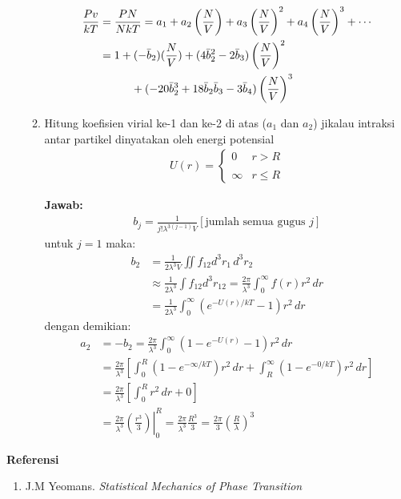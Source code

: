 \documentclass[a4paper , 12pt, cc]{article}
\begin{document}
\begin{enumerate}
\begin{enumerate}
\begin{align}
\frac{Pv}{kT} & = \frac{PN}{NkT} = a_1 + a_2 \left( \frac{N}{V}\right) + a_3 \left( \frac{N}{V}\right)^2 + a_4 \left( \frac{N}{V}\right)^3 + \cdots \nonumber \\
& = 1 + (- \bar{b}_2 )(\frac{N}{V}) + (4 \bar{b}_2^2 - 2 \bar{b}_3) \left( \frac{N}{V}\right)^2 \nonumber \\
& \hspace{1 cm } + (- 20 \bar{b}_2^3 + 18 \bar{b}_2 \bar{b}_3  - 3 \bar{b}_4) \left( \frac{N}{V}\right)^3 
\end{align}
\item Hitung koefisien virial ke-1 dan ke-2 di atas ($a_1$ dan $a_2$) jikalau intraksi antar partikel dinyatakan oleh energi potensial
\begin{align}
U(r) = \left\{ 
\begin{array}{ll}
0 & r > R \\
& \\
\infty & r\le R
\end{array}
 \right.
\end{align}

\textbf{Jawab:} \newline 
\begin{align}
b_j = \frac{1}{j! \lambda^{3 (j -1) }V} [\text{jumlah semua gugus }j]
\end{align}
untuk $j = 1$ maka:
\begin{align}
b_2&= \frac{1}{2 \lambda^3 V} \iint f_{12} d^3r_1 \, d^3 r_2 \nonumber \\
& \approx \frac{1}{2 \lambda^3} \int f_{12} d^3 r_{12} = \frac{2\pi}{\lambda^3} \int_{0}^{\infty } f(r) r^2 \, dr \nonumber \\
& = \frac{1}{2 \lambda^3 } \int_{ 0}^{\infty } \left( e^{- U(r)/kT} -1\right) r^2 \, dr  
\end{align}
dengan demikian:
\begin{align}
a_2 & = - b_2  = \frac{2\pi}{\lambda^3} \int_{0}^{\infty} (1 - e^{- U(r)} - 1)r^2 \, dr \nonumber \\
& = \frac{2\pi }{\lambda^3} \left[ \int_0^R (1 - e^{- \infty /kT}) r^2 \, dr + \int_{R}^{\infty } (1 - e^{- 0 /kT} )r^2 \, dr  \right]  \nonumber \\
& = \frac{2 \pi }{\lambda^3} \left [ \int_{0}^{R} r^2 \, dr  + 0 \right ]  \nonumber \\
& = \left. \frac{2 \pi }{\lambda^3} \left( \frac{r^3}{3}\right)\right |_0^R  = \frac{2 \pi }{\lambda^3} \frac{R^3}{3} = \frac{2 \pi }{3} \left( \frac{R}{\lambda}\right)^3
 \end{align}
\end{enumerate}
\end{enumerate}
\textbf{Referensi} \newline
\begin{enumerate}
\item J.M Yeomans. \textit{Statistical Mechanics of Phase Transition} \label{ref 1}
\end{enumerate}
\end{document}
